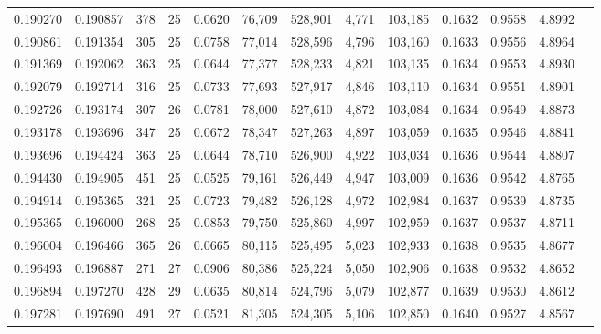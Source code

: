 \begin{tabular}{rrrrrrrrrrrrr}
0.190270 & 0.190857 &   378 &  25 &                                     0.0620 &  76,709 & 528,901 &   4,771 & 103,185 & 0.1632 & 0.9558 & 4.8992 \\
0.190861 & 0.191354 &   305 &  25 &                                     0.0758 &  77,014 & 528,596 &   4,796 & 103,160 & 0.1633 & 0.9556 & 4.8964 \\
0.191369 & 0.192062 &   363 &  25 &                                     0.0644 &  77,377 & 528,233 &   4,821 & 103,135 & 0.1634 & 0.9553 & 4.8930 \\
0.192079 & 0.192714 &   316 &  25 &                                     0.0733 &  77,693 & 527,917 &   4,846 & 103,110 & 0.1634 & 0.9551 & 4.8901 \\
0.192726 & 0.193174 &   307 &  26 &                                     0.0781 &  78,000 & 527,610 &   4,872 & 103,084 & 0.1634 & 0.9549 & 4.8873 \\
0.193178 & 0.193696 &   347 &  25 &                                     0.0672 &  78,347 & 527,263 &   4,897 & 103,059 & 0.1635 & 0.9546 & 4.8841 \\
0.193696 & 0.194424 &   363 &  25 &                                     0.0644 &  78,710 & 526,900 &   4,922 & 103,034 & 0.1636 & 0.9544 & 4.8807 \\
0.194430 & 0.194905 &   451 &  25 &                                     0.0525 &  79,161 & 526,449 &   4,947 & 103,009 & 0.1636 & 0.9542 & 4.8765 \\
0.194914 & 0.195365 &   321 &  25 &                                     0.0723 &  79,482 & 526,128 &   4,972 & 102,984 & 0.1637 & 0.9539 & 4.8735 \\
0.195365 & 0.196000 &   268 &  25 &                                     0.0853 &  79,750 & 525,860 &   4,997 & 102,959 & 0.1637 & 0.9537 & 4.8711 \\
0.196004 & 0.196466 &   365 &  26 &                                     0.0665 &  80,115 & 525,495 &   5,023 & 102,933 & 0.1638 & 0.9535 & 4.8677 \\
0.196493 & 0.196887 &   271 &  27 &                                     0.0906 &  80,386 & 525,224 &   5,050 & 102,906 & 0.1638 & 0.9532 & 4.8652 \\
0.196894 & 0.197270 &   428 &  29 &                                     0.0635 &  80,814 & 524,796 &   5,079 & 102,877 & 0.1639 & 0.9530 & 4.8612 \\
0.197281 & 0.197690 &   491 &  27 &                                     0.0521 &  81,305 & 524,305 &   5,106 & 102,850 & 0.1640 & 0.9527 & 4.8567 \\

\end{tabular}
